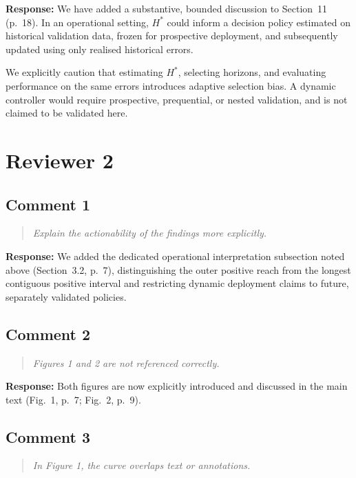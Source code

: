 \documentclass[11pt,a4paper]{article}
\newenvironment{reviewcomment}
  {\begin{quote}\itshape}
  {\end{quote}}
\newcommand{\response}{\noindent\textbf{Response:} }
\begin{document}
\response
We have added a substantive, bounded discussion to Section~11 (p.~18). In an
operational setting, $H^*$ could inform a decision policy estimated on
historical validation data, frozen for prospective deployment, and subsequently
updated using only realised historical errors.

We explicitly caution that estimating $H^*$, selecting horizons, and
evaluating performance on the same errors introduces adaptive selection bias.
A dynamic controller would require prospective, prequential, or nested
validation, and is not claimed to be validated here.


\section*{Reviewer 2}

\subsection*{Comment 1}

\begin{reviewcomment}
Explain the actionability of the findings more explicitly.
\end{reviewcomment}

\response
We added the dedicated operational interpretation subsection noted above
(Section~3.2, p.~7), distinguishing the outer positive reach from the longest
contiguous positive interval and restricting dynamic deployment claims to
future, separately validated policies.


\subsection*{Comment 2}

\begin{reviewcomment}
Figures 1 and 2 are not referenced correctly.
\end{reviewcomment}

\response
Both figures are now explicitly introduced and discussed in the main text
(Fig.~1, p.~7; Fig.~2, p.~9).


\subsection*{Comment 3}

\begin{reviewcomment}
In Figure 1, the curve overlaps text or annotations.
\end{reviewcomment}
\end{document}
